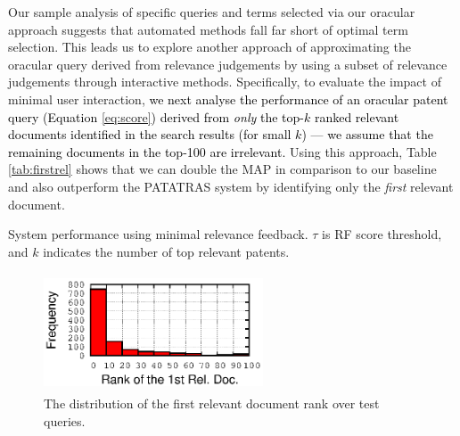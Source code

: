 Our sample analysis of specific queries and terms selected via our oracular
approach suggests that automated methods fall far short of optimal term selection.
This leads us to explore another approach of approximating the oracular query
derived from relevance judgements by using a subset of relevance judgements
through interactive methods.  Specifically, to evaluate the impact of minimal user interaction,
\textcolor{black}{we next analyse the performance of an oracular patent query (Equation \ref{eq:score}) derived from
\emph{only} the top-$k$ ranked relevant documents identified in the search results (for small $k$) --- we assume that the remaining documents in the top-100 are irrelevant.}
Using this approach, Table \ref{tab:firstrel} shows that we can double the MAP in comparison to our baseline and also outperform the PATATRAS system by identifying only the \emph{first} relevant document.
\begin{table}[t!]
  \begin{center}
   \caption{System performance using minimal relevance feedback. $\tau$ is RF score threshold, and $k$ indicates the number of top relevant patents.}\vspace{3mm}
     
  \label{tab:firstrel}
  \end{center}  
\end{table}
\begin{figure}[t!]
\begin{centering}
\includegraphics[width=6.5cm, height=3.5cm]{figs/1stRank}
\par\end{centering}

\protect\caption{The distribution of the first relevant document rank over test queries.}
\label{fig:FirstTPRankHisto}
\end{figure}

